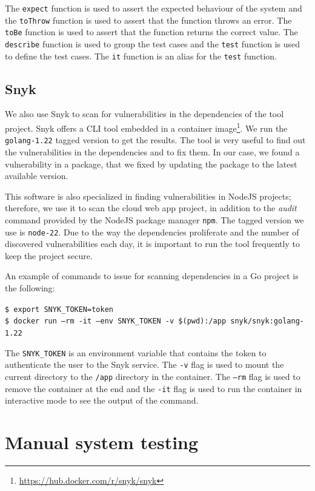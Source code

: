 The \texttt{expect} function is used to assert the expected behaviour of the system and the \texttt{toThrow} function is used to assert that the function throws an error. The \texttt{toBe} function is used to assert that the function returns the correct value. The \texttt{describe} function is used to group the test cases and the \texttt{test} function is used to define the test cases. The \texttt{it} function is an alias for the \texttt{test} function.

\subsection{Snyk}

We also use Snyk to scan for vulnerabilities in the dependencies of the tool project. Snyk offers a CLI tool embedded in a container image\footnote{\url{https://hub.docker.com/r/snyk/snyk}}. We run the \texttt{golang-1.22} tagged version to get the results. The tool is very useful to find out the vulnerabilities in the dependencies and to fix them. In our case, we found a vulnerability in a package, that we fixed by updating the package to the latest available version.

This software is also specialized in finding vulnerabilities in NodeJS projects; therefore, we use it to scan the cloud web app project, in addition to the \textit{audit} command provided by the NodeJS package manager \texttt{npm}. The tagged version we use is \texttt{node-22}. Due to the way the dependencies proliferate and the number of discovered vulnerabilities each day, it is important to run the tool frequently to keep the project secure.

An example of commands to issue for scanning dependencies in a Go project is the following:
\begin{mdframed}
  \texttt{\$ export SNYK\_TOKEN=token}\\
  \texttt{\$ docker run --rm -it --env SNYK\_TOKEN -v \$(pwd):/app snyk/snyk:golang-1.22}
\end{mdframed}
The \texttt{SNYK\_TOKEN} is an environment variable that contains the token to authenticate the user to the Snyk service. The \texttt{-v} flag is used to mount the current directory to the \texttt{/app} directory in the container. The \texttt{--rm} flag is used to remove the container at the end and the \texttt{-it} flag is used to run the container in interactive mode to see the output of the command.

\section{Manual system testing}

